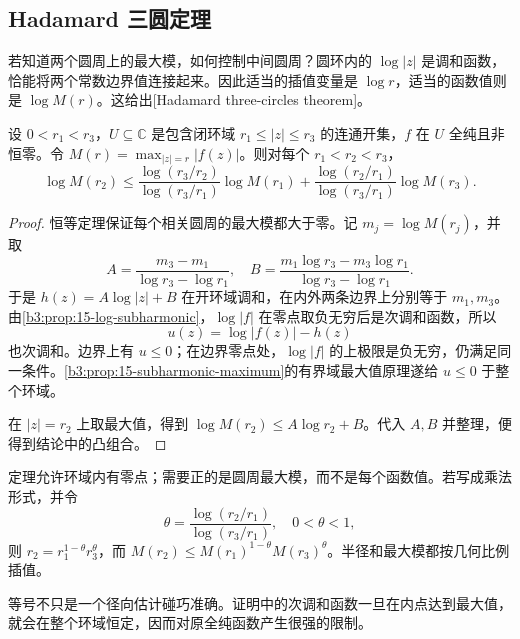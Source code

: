 \subsection{Hadamard 三圆定理}
\label{b3:subsec:190103}

若知道两个圆周上的最大模，如何控制中间圆周？圆环内的 \(\log|z|\) 是调和函数，恰能将两个常数边界值连接起来。因此适当的插值变量是 \(\log r\)，适当的函数值则是 \(\log M(r)\)。这给出[Hadamard three-circles theorem]。

\begin{theorem}[Hadamard 三圆]\label{b3:thm:19-three-circles}
设 \(0<r_1<r_3\)，\(U\subseteq\mathbb C\) 是包含闭环域 \(r_1\le|z|\le r_3\) 的连通开集，\(f\) 在 \(U\) 全纯且非恒零。令 \(M(r)=\max_{|z|=r}|f(z)|\)。则对每个 \(r_1<r_2<r_3\)，
\[
 \log M(r_2)\le
 \frac{\log(r_3/r_2)}{\log(r_3/r_1)}\log M(r_1)
 +\frac{\log(r_2/r_1)}{\log(r_3/r_1)}\log M(r_3).
\]
\end{theorem}
\begin{proof}
恒等定理保证每个相关圆周的最大模都大于零。记 \(m_j=\log M(r_j)\)，并取
\[
 A=\frac{m_3-m_1}{\log r_3-\log r_1},\quad
 B=\frac{m_1\log r_3-m_3\log r_1}{\log r_3-\log r_1}.
\]
于是 \(h(z)=A\log|z|+B\) 在开环域调和，在内外两条边界上分别等于 \(m_1,m_3\)。由\cref{b3:prop:15-log-subharmonic}，\(\log|f|\) 在零点取负无穷后是次调和函数，所以
\[
 u(z)=\log|f(z)|-h(z)
\]
也次调和。边界上有 \(u\le0\)；在边界零点处，\(\log|f|\) 的上极限是负无穷，仍满足同一条件。\cref{b3:prop:15-subharmonic-maximum}的有界域最大值原理遂给 \(u\le0\) 于整个环域。

在 \(|z|=r_2\) 上取最大值，得到 \(\log M(r_2)\le A\log r_2+B\)。代入 \(A,B\) 并整理，便得到结论中的凸组合。
\end{proof}
定理允许环域内有零点；需要正的是圆周最大模，而不是每个函数值。若写成乘法形式，并令
\[
 \theta=\frac{\log(r_2/r_1)}{\log(r_3/r_1)},\quad 0<\theta<1,
\]
则 \(r_2=r_1^{1-\theta}r_3^\theta\)，而 \(M(r_2)\le M(r_1)^{1-\theta}M(r_3)^\theta\)。半径和最大模都按几何比例插值。

\ProseParagraphBreak

等号不只是一个径向估计碰巧准确。证明中的次调和函数一旦在内点达到最大值，就会在整个环域恒定，因而对原全纯函数产生很强的限制。

